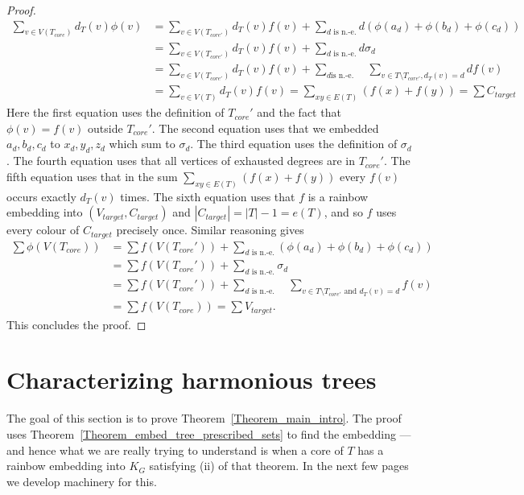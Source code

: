 \documentclass[a4paper,11pt,hidelinks]{amsart}
\theoremstyle{definition}
\begin{document}
\begin{proof}
\begin{align*}
\sum_{v\in V(T_{core})}d_T(v)\phi(v)
&=\sum_{v\in V(T_{core'})}d_T(v)f(v)+\sum_{d \text{ is n.-e.}}d(\phi(a_d)+\phi(b_d)+\phi(c_d)) \\
&=
\sum_{v\in V(T_{core'})}d_T(v)f(v)+\sum_{d \text{ is n.-e.}}d\sigma_d \\
&=\sum_{v\in V(T_{core'})}d_T(v)f(v)+
\sum_{d \text{is n.-e.}}\quad \sum_{v\in T\setminus T_{core'}, d_T(v)=d} df(v) \\
&=\sum_{v\in V(T)}d_T(v)f(v)
=\sum_{xy\in E(T)}(f(x)+f(y))
=\sum C_{target}
\end{align*}
Here the first equation uses the definition of $T_{core}'$ and the fact that $\phi(v)=f(v)$ outside $T_{core}'$. The second equation uses that we embedded $a_d, b_d, c_d$ to $x_d, y_d, z_d$ which sum to $\sigma_d$. The third equation uses the definition of $\sigma_d$. The fourth equation uses that all vertices of exhausted degrees are in $T_{core}'$.
The fifth equation uses that in the sum $\sum_{xy\in E(T)}(f(x)+f(y))$ every $f(v)$ occurs exactly $d_T(v)$ times. The sixth equation uses that $f$ is a rainbow embedding into $(V_{target}, C_{target})$ and $|C_{target}|= |T|-1=e(T)$, and so $f$ uses every colour of $C_{target}$ precisely once. Similar reasoning gives 
\begin{align*}
\sum\phi(V(T_{core}))
&=\sum f(V(T_{core}'))+\sum_{d \text{ is n.-e.}}(\phi(a_d)+\phi(b_d)+\phi(c_d)) \\
&=
\sum f(V(T_{core}'))+\sum_{d \text{ is n.-e.}}\sigma_d \\
&=\sum f(V(T_{core}'))+
\sum_{d \text{ is n.-e.}}\quad\sum_{v\in T\setminus T_{core'} \text{ and } d_T(v)=d} f(v) \\
&=\sum f(V(T_{core}))=\sum V_{target}.\end{align*}This concludes the proof.\end{proof}
 

\section{Characterizing harmonious trees}\label{sec:characterisation}
The goal of this section is to prove Theorem~\ref{Theorem_main_intro}. The proof uses Theorem~\ref{Theorem_embed_tree_prescribed_sets} to find the embedding --- and hence what we are really trying to understand is when a core of $T$ has a rainbow embedding into $K_G$ satisfying  (ii) of that theorem. In the next few pages we develop machinery for this.
\end{document}
